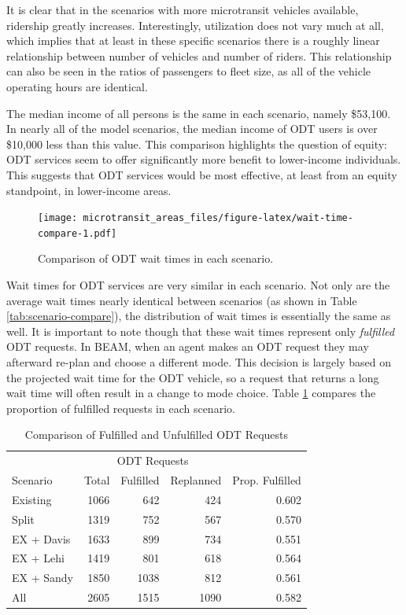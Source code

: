 \documentclass[
]{report}
\begin{document}
It is clear that in the scenarios with more microtransit vehicles available, ridership greatly increases. Interestingly, utilization does not vary much at all, which implies that at least in these specific scenarios there is a roughly linear relationship between number of vehicles and number of riders. This relationship can also be seen in the ratios of passengers to fleet size, as all of the vehicle operating hours are identical.

The median income of all persons is the same in each scenario, namely \$53,100. In nearly all of the model scenarios, the median income of ODT users is over \$10,000 less than this value. This comparison highlights the question of equity: ODT services seem to offer significantly more benefit to lower-income individuals. This suggests that ODT services would be most effective, at least from an equity standpoint, in lower-income areas.

\begin{figure}
\centering
\texttt{[image: microtransit\_areas\_files/figure-latex/wait-time-compare-1.pdf]}
\caption{\label{fig:wait-time-compare}Comparison of ODT wait times in each scenario.}
\end{figure}

Wait times for ODT services are very similar in each scenario. Not only are the average wait times nearly identical between scenarios (as shown in Table \ref{tab:scenario-compare}), the distribution of wait times is essentially the same as well. It is important to note though that these wait times represent only \emph{fulfilled} ODT requests. In BEAM, when an agent makes an ODT request they may afterward re-plan and choose a different mode. This decision is largely based on the projected wait time for the ODT vehicle, so a request that returns a long wait time will often result in a change to mode choice. Table \ref{tab:odt-fulfillment} compares the proportion of fulfilled requests in each scenario.

\begin{table}

\caption{\label{tab:odt-fulfillment}Comparison of Fulfilled and Unfulfilled ODT Requests}
\centering
\begin{tabular}[t]{lrrrr}
\toprule
\multicolumn{1}{c}{} & \multicolumn{3}{c}{ODT Requests} & \multicolumn{1}{c}{} \\
\cmidrule(l{3pt}r{3pt}){2-4}
Scenario & Total & Fulfilled & Replanned & Prop. Fulfilled\\
\midrule
Existing & 1066 & 642 & 424 & 0.602\\
Split & 1319 & 752 & 567 & 0.570\\
EX + Davis & 1633 & 899 & 734 & 0.551\\
EX + Lehi & 1419 & 801 & 618 & 0.564\\
EX + Sandy & 1850 & 1038 & 812 & 0.561\\
\addlinespace
All & 2605 & 1515 & 1090 & 0.582\\
\bottomrule
\end{tabular}
\end{table}
\end{document}
